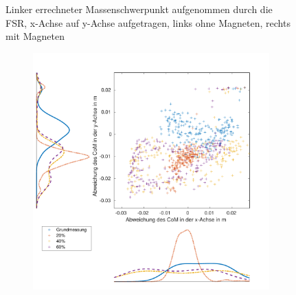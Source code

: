 \begin{figure}[tb]
\begin{adjustwidth}{-0.2\linewidth}{-0.2\linewidth}
\begin{subfigure}[c]{.45\linewidth}
			\vspace{5pt}
		\end{subfigure}
	\end{adjustwidth}
	\caption{Linker errechneter Massenschwerpunkt aufgenommen durch die FSR, x-Achse auf y-Achse aufgetragen, links ohne Magneten, rechts mit Magneten} \label{CoM_links}
\end{figure}
\begin{figure}[tb]
	\centering
	\begin{adjustwidth}{-0.2\linewidth}{-0.2\linewidth}
		\hspace{5pt}
		\begin{subfigure}[c]{.45\linewidth}
			\centering
			\includegraphics[width=\linewidth]{Bilder/rechts_CoM_ohneM.pdf}
			\vspace{5pt}
		\end{subfigure}
		\hspace{20pt}
		\begin{subfigure}[c]{.45\linewidth}
			\centering

\end{subfigure}
\end{adjustwidth}
\end{figure}
